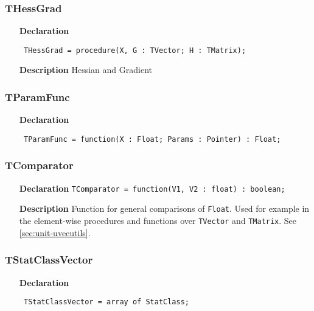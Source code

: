 \documentclass[12pt,a4paper,oneside]{report}
\newcommand{\lmath}[1]{   %
	\marginpar{\vspace{#1} 
		\begin{flushright}
			LMath
	\end{flushright} }
}
\newcommand{\lmatha}[1]{   %
	\marginpar{\vspace{#1} 
		\begin{flushright}
			LMath 0.5
	\end{flushright} }
}
\newcommand{\declarationitem}[1]{\textbf{#1}}
\newcommand{\descriptiontitle}[1]{\textbf{#1}}
\newcommand{\code}[1]{\texttt{#1}}
\begin{document}
\subsubsection{THessGrad}
\label{utypes-THessGrad}
\begin{itemize}\item[\declarationitem{Declaration}\hfill]
	\begin{flushleft}
		\code{
			THessGrad = procedure(X, G : TVector; H : TMatrix);}
		
	\end{flushleft}
	
	\par
	\item[\descriptiontitle{Description}]
	Hessian and Gradient
	
\end{itemize}
\subsubsection{TParamFunc}
\lmath{-24pt}
\label{utypes-TParamFunc}
\begin{itemize}\item[\declarationitem{Declaration}\hfill]
	\begin{flushleft}
		\code{
			TParamFunc = function(X : Float; Params : Pointer) : Float;}
	\end{flushleft}
\end{itemize}
\subsubsection{TComparator}
\label{utypes-TComparator}
\lmatha{-24pt}
\begin{itemize}
	\item[\declarationitem{Declaration}\hfill]
	\code{TComparator = function(V1, V2 : float) : boolean;}
	\item[\descriptiontitle{Description}]Function for general comparisons of \code{Float}. Used for example in the element-wise procedures and functions over \code{TVector} and \code{TMatrix}. See \ref{sec:unit-uvecutils}.
\end{itemize}
\subsubsection{TStatClassVector}
\label{utypes-TStatClassVector}
\begin{itemize}\item[\declarationitem{Declaration}\hfill]
	\begin{flushleft}
		\code{
			TStatClassVector = array of StatClass;}
		
	\end{flushleft}
	
\end{itemize}
\end{document}
